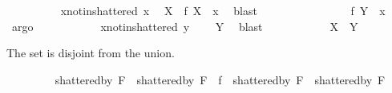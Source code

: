 \begin{isabellebody}
\ \ \ \ \ \ \ \ \isamarkupfalse%
\ x{\isacharunderscore}{\kern0pt}not{\isacharunderscore}{\kern0pt}in{\isacharunderscore}{\kern0pt}shattered\ x{}\ \isamarkupfalse%
\ {\isachardoublequoteopen}X\ {\isacharequal}{\kern0pt}\ {\isacharquery}{\kern0pt}f\ X\ {\isacharminus}{\kern0pt}\ {\isacharbraceleft}{\kern0pt}x{\isacharbraceright}{\kern0pt}{\isachardoublequoteclose}\ \isamarkupfalse%
\ blast\isanewline
\ \ \ \ \ \ \ \ \isamarkupfalse%
\ \isamarkupfalse%
\ {}\ \isamarkupfalse%
\ {\isachardoublequoteopen}{\isachardot}{\kern0pt}{\isachardot}{\kern0pt}{\isachardot}{\kern0pt}\ {\isacharequal}{\kern0pt}\ {\isacharquery}{\kern0pt}f\ Y\ {\isacharminus}{\kern0pt}\ {\isacharbraceleft}{\kern0pt}x{\isacharbraceright}{\kern0pt}{\isachardoublequoteclose}\ \isamarkupfalse%
\ argo\isanewline
\ \ \ \ \ \ \ \ \isamarkupfalse%
\ \isamarkupfalse%
\ x{\isacharunderscore}{\kern0pt}not{\isacharunderscore}{\kern0pt}in{\isacharunderscore}{\kern0pt}shattered\ y{}\ \isamarkupfalse%
\ {\isachardoublequoteopen}{\isachardot}{\kern0pt}{\isachardot}{\kern0pt}{\isachardot}{\kern0pt}\ {\isacharequal}{\kern0pt}\ Y{\isachardoublequoteclose}\ \isamarkupfalse%
\ blast\isanewline
\ \ \ \ \ \ \ \ \isamarkupfalse%
\ \isamarkupfalse%
\ {\isachardoublequoteopen}X\ {\isacharequal}{\kern0pt}\ Y{\isachardoublequoteclose}\ \isacommand{{\isachardot}{\kern0pt}}\isamarkupfalse%
\isanewline
\ \ \ \ \ \ \isamarkupfalse%
%
\begin{isamarkuptext}%
The set is disjoint from the union.%
\end{isamarkuptext}\isamarkuptrue%
\ \ \ \ \ \ \isamarkupfalse%
\ {}{\isacharcolon}{\kern0pt}\ {\isachardoublequoteopen}{\isacharparenleft}{\kern0pt}shattered{\isacharunderscore}{\kern0pt}by\ {\isacharquery}{\kern0pt}F{}\ {\isasymunion}\ shattered{\isacharunderscore}{\kern0pt}by\ {\isacharquery}{\kern0pt}F{}{\isacharparenright}{\kern0pt}\ {\isasyminter}\ {\isacharquery}{\kern0pt}f\ {\isacharbackquote}{\kern0pt}\ {\isacharparenleft}{\kern0pt}shattered{\isacharunderscore}{\kern0pt}by\ {\isacharquery}{\kern0pt}F{}\ {\isasyminter}\ shattered{\isacharunderscore}{\kern0pt}by\ {\isacharquery}{\kern0pt}F{}{\isacharparenright}{\kern0pt}\ {\isacharequal}{\kern0pt}\ {\isacharbraceleft}{\kern0pt}{\isacharbraceright}{\kern0pt}{\isachardoublequoteclose}\isanewline

\end{isabellebody}
